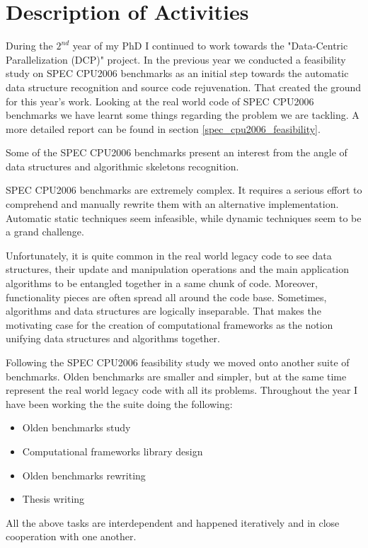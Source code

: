 \documentclass[10pt,a4paper]{report}
\begin{document}
\section{Description of Activities}
\label{active_description}
\quad During the $2^{nd}$ year of my PhD I continued to work towards the "Data-Centric Parallelization (DCP)" project. In the previous year we conducted a feasibility study on SPEC CPU2006 benchmarks as an initial step towards the automatic data structure recognition and source code rejuvenation. That created the ground for this year's work. Looking at the real world code of SPEC CPU2006 benchmarks we have learnt some things regarding the problem we are tackling. A more detailed report can be found in section \ref{spec_cpu2006_feasibility}.
\begin{description}[style=nextline]
\item [Research interest] Some of the SPEC CPU2006 benchmarks present an interest from the angle of data structures and algorithmic skeletons recognition.\hfill
\item [Real world legacy code complexity] SPEC CPU2006 benchmarks are extremely complex. It requires a serious effort to comprehend and manually rewrite them with an alternative implementation. Automatic static techniques seem infeasible, while dynamic techniques seem to be a grand challenge.\hfill
\item [Close relationship between algorithms and data structures] Unfortunately, it is quite common in the real world legacy code to see data structures, their update and manipulation operations and the main application algorithms to be entangled together in a same chunk of code. Moreover, functionality pieces are often spread all around the code base. Sometimes, algorithms and data structures are logically inseparable. That makes the motivating case for the creation of computational frameworks as the notion unifying data structures and algorithms together.\hfill
\end{description}
\quad Following the SPEC CPU2006 feasibility study we moved onto another suite of benchmarks. Olden benchmarks are smaller and simpler, but at the same time represent the real world legacy code with all its problems. Throughout the year I have been working the the suite doing the following: 
\begin{itemize}
\renewcommand\labelitemi{$\bullet$}
\item Olden benchmarks study
\item Computational frameworks library design
\item Olden benchmarks rewriting
\item Thesis writing
\end{itemize}
\quad All the above tasks are interdependent and happened iteratively and in close cooperation with one another.
\end{document}
